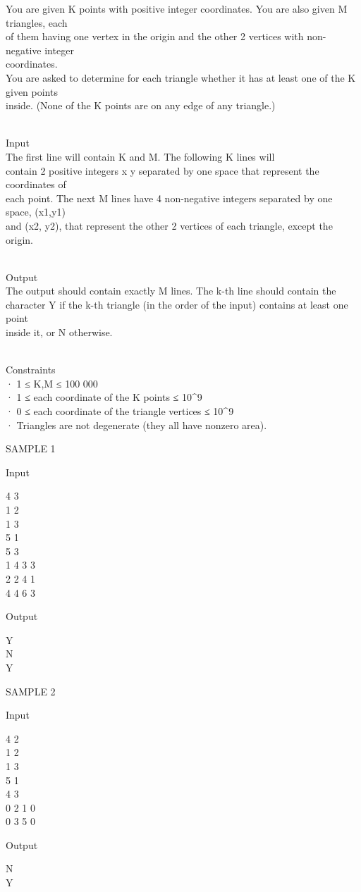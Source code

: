 



   You are given K points with positive integer coordinates. You are also given M triangles, each   
\\   of them having one vertex in the origin and the other 2 vertices with non-negative integer   
\\   coordinates.   
\\   You are asked to determine for each triangle whether it has at least one of the K given points   
\\   inside. (None of the K points are on any edge of any triangle.)  


\\   Input   
\\   The first line will contain K and M. The following K lines will   
\\   contain 2 positive integers x y separated by one space that represent the coordinates of   
\\   each point. The next M lines have 4 non-negative integers separated by one space, (x1,y1)   
\\   and (x2, y2), that represent the other 2 vertices of each triangle, except the origin.  


\\   Output   
\\   The output should contain exactly M lines. The k-th line should contain the   
\\   character Y if the k-th triangle (in the order of the input) contains at least one point   
\\   inside it, or N otherwise.  


\\   Constraints   
\\   · 1 ≤ K,M ≤ 100 000   
\\   · 1 ≤ each coordinate of the K points ≤ 10\textasciicircum9   
\\   · 0 ≤ each coordinate of the triangle vertices ≤ 10\textasciicircum9   
\\   · Triangles are not degenerate (they all have nonzero area).  

   SAMPLE 1  

   Input  

   4 3   
\\   1 2   
\\   1 3   
\\   5 1   
\\   5 3   
\\   1 4 3 3   
\\   2 2 4 1   
\\   4 4 6 3  

   Output  

   Y   
\\   N   
\\   Y  

   SAMPLE 2  

   Input  

   4 2   
\\   1 2   
\\   1 3   
\\   5 1   
\\   4 3   
\\   0 2 1 0   
\\   0 3 5 0  

   Output  

   N   
\\   Y  